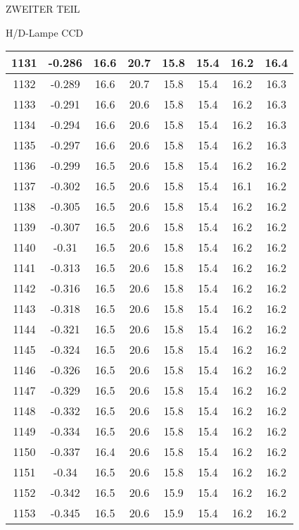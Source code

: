 \begin{appendix}
\begin{chapter}{ZWEITER TEIL}
\begin{section}{H/D-Lampe CCD}
\begin{scriptsize}
\begin{longtable}[htbp]{|c|c|c|c|c|c|c|c|}
            1131 & -0.286 & 16.6 & 20.7 & 15.8 & 15.4 & 16.2 & 16.4 \\ \hline
            1132 & -0.289 & 16.6 & 20.7 & 15.8 & 15.4 & 16.2 & 16.3 \\ \hline
            1133 & -0.291 & 16.6 & 20.6 & 15.8 & 15.4 & 16.2 & 16.3 \\ \hline
            1134 & -0.294 & 16.6 & 20.6 & 15.8 & 15.4 & 16.2 & 16.3 \\ \hline
            1135 & -0.297 & 16.6 & 20.6 & 15.8 & 15.4 & 16.2 & 16.3 \\ \hline
            1136 & -0.299 & 16.5 & 20.6 & 15.8 & 15.4 & 16.2 & 16.2 \\ \hline
            1137 & -0.302 & 16.5 & 20.6 & 15.8 & 15.4 & 16.1 & 16.2 \\ \hline
            1138 & -0.305 & 16.5 & 20.6 & 15.8 & 15.4 & 16.2 & 16.2 \\ \hline
            1139 & -0.307 & 16.5 & 20.6 & 15.8 & 15.4 & 16.2 & 16.2 \\ \hline
            1140 & -0.31 & 16.5 & 20.6 & 15.8 & 15.4 & 16.2 & 16.2 \\ \hline
            1141 & -0.313 & 16.5 & 20.6 & 15.8 & 15.4 & 16.2 & 16.2 \\ \hline
            1142 & -0.316 & 16.5 & 20.6 & 15.8 & 15.4 & 16.2 & 16.2 \\ \hline
            1143 & -0.318 & 16.5 & 20.6 & 15.8 & 15.4 & 16.2 & 16.2 \\ \hline
            1144 & -0.321 & 16.5 & 20.6 & 15.8 & 15.4 & 16.2 & 16.2 \\ \hline
            1145 & -0.324 & 16.5 & 20.6 & 15.8 & 15.4 & 16.2 & 16.2 \\ \hline
            1146 & -0.326 & 16.5 & 20.6 & 15.8 & 15.4 & 16.2 & 16.2 \\ \hline
            1147 & -0.329 & 16.5 & 20.6 & 15.8 & 15.4 & 16.2 & 16.2 \\ \hline
            1148 & -0.332 & 16.5 & 20.6 & 15.8 & 15.4 & 16.2 & 16.2 \\ \hline
            1149 & -0.334 & 16.5 & 20.6 & 15.8 & 15.4 & 16.2 & 16.2 \\ \hline
            1150 & -0.337 & 16.4 & 20.6 & 15.8 & 15.4 & 16.2 & 16.2 \\ \hline
            1151 & -0.34 & 16.5 & 20.6 & 15.8 & 15.4 & 16.2 & 16.2 \\ \hline
            1152 & -0.342 & 16.5 & 20.6 & 15.9 & 15.4 & 16.2 & 16.2 \\ \hline
            1153 & -0.345 & 16.5 & 20.6 & 15.9 & 15.4 & 16.2 & 16.2 \\ \hline

\end{longtable}
\end{scriptsize}
\end{section}
\end{chapter}
\end{appendix}

